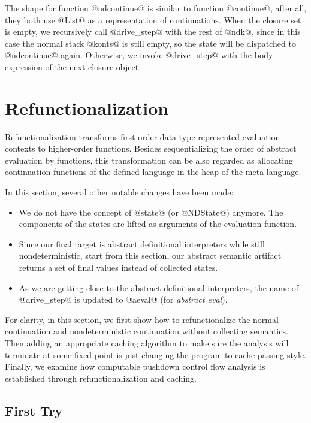\documentclass[acmsmall,review,anonymous]{acmart}\settopmatter{printfolios=true,printccs=false,printacmref=false}
\begin{document}
The shape for function @ndcontinue@ is similar to function @continue@, after
all, they both use @List@ as a representation of continuations.
When the closure set is empty, we recursively call @drive_step@ with the rest
of @ndk@, since in this case the normal stack @konts@ is still empty, so
the state will be dispatched to @ndcontinue@ again.
Otherwise, we invoke @drive_step@ with the body expression of the next closure object.

\section{Refunctionalization} \label{refunc}

Refunctionalization transforms first-order data type represented
evaluation contexts to higher-order functions.
Besides sequentializing the order of abstract evaluation by functions,
this transformation can be also regarded as allocating continuation functions of
the defined language in the heap of the meta language.

In this section, several other notable changes have been made:
\begin{itemize}
\item We do not have the concept of @state@ (or @NDState@) anymore.
  The components of the states are lifted as arguments of the evaluation
  function.
\item Since our final target is abstract definitional interpreters while still
nondeterministic, start from this section, our abstract semantic artifact
returns a set of final values instead of collected states.
\item As we are getting close to the
abstract definitional interpreters, the name of @drive_step@ is updated to
@aeval@ (for \emph{abstract eval}).
\end{itemize}

For clarity, in this section, we first show how to refunctionalize the normal continuation and
nondeterministic continuation without collecting semantics.
Then adding an appropriate caching algorithm to make sure the analysis will
terminate at some fixed-point is just changing the program to cache-passing style.
Finally, we examine how computable pushdown control flow analysis is established
through refunctionalization and caching.

\subsection{First Try}
\end{document}
